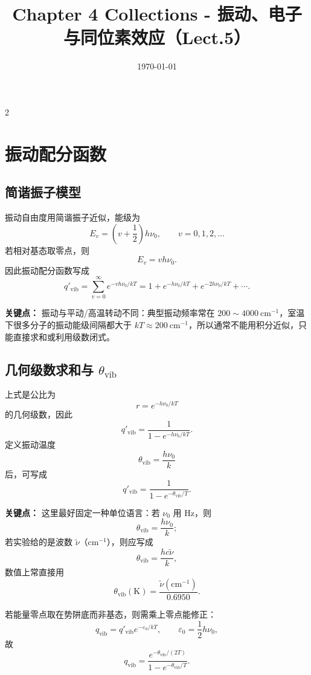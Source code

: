 \documentclass[a4paper,9pt]{article}
\title{\vspace{-2em}\Large\bfseries\color{sectioncolor} Chapter 4 Collections - 振动、电子与同位素效应（Lect.5）\vspace{-1em}}
\author{}
\date{\today}
\newenvironment{keypoint}
{\par\vspace{0.3em}\noindent\begin{tcolorbox}[colback=keybg,colframe=keycolor,boxrule=0.5pt,arc=2pt,left=2pt,right=2pt,top=2pt,bottom=2pt,boxsep=0pt]\noindent\textcolor{keycolor}{\textbf{关键点：}}}
{\end{tcolorbox}\par\vspace{0.3em}}
\begin{document}
\maketitle
\thispagestyle{fancy}
\begin{multicols}{2}
	\scriptsize{\tableofcontents}

	\section{振动配分函数}

	\subsection{简谐振子模型}
	振动自由度用简谐振子近似，能级为
	\[
		E_v=\left(v+\frac12\right)h\nu_0,
		\qquad v=0,1,2,\dots
	\]
	若相对基态取零点，则
	\[
		E_v=vh\nu_0.
	\]
	因此振动配分函数写成
	\[
		q'_{\mathrm{vib}}=\sum_{v=0}^{\infty} e^{-vh\nu_0/kT}
		=1+e^{-h\nu_0/kT}+e^{-2h\nu_0/kT}+\cdots.
	\]

	\begin{keypoint}
		振动与平动/高温转动不同：典型振动频率常在 $200\sim 4000\ \mathrm{cm^{-1}}$，室温下很多分子的振动能级间隔都大于 $kT\approx 200\ \mathrm{cm^{-1}}$，所以通常不能用积分近似，只能直接求和或利用级数闭式。
	\end{keypoint}

	\subsection{几何级数求和与 $\theta_{\mathrm{vib}}$}
	上式是公比为
	\[
		r=e^{-h\nu_0/kT}
	\]
	的几何级数，因此
	\[
		q'_{\mathrm{vib}}=\frac{1}{1-e^{-h\nu_0/kT}}.
	\]
	定义振动温度
	\[
		\theta_{\mathrm{vib}}=\frac{h\nu_0}{k}
	\]
	后，可写成
	\[
		q'_{\mathrm{vib}}=\frac{1}{1-e^{-\theta_{\mathrm{vib}}/T}}.
	\]

	\begin{keypoint}
		这里最好固定一种单位语言：若 $\nu_0$ 用 Hz，则
		\[
			\theta_{\mathrm{vib}}=\frac{h\nu_0}{k};
		\]
		若实验给的是波数 $\tilde\nu$（$\mathrm{cm^{-1}}$），则应写成
		\[
			\theta_{\mathrm{vib}}=\frac{hc\tilde\nu}{k},
		\]
		数值上常直接用
		\[
			\theta_{\mathrm{vib}}(\mathrm K)=\frac{\tilde\nu(\mathrm{cm^{-1}})}{0.6950}.
		\]
	\end{keypoint}

	若能量零点取在势阱底而非基态，则需乘上零点能修正：
	\[
		q_{\mathrm{vib}}=q'_{\mathrm{vib}}e^{-\varepsilon_0/kT},
		\qquad \varepsilon_0=\frac12 h\nu_0,
	\]
	故
	\[
		q_{\mathrm{vib}}=\frac{e^{-\theta_{\mathrm{vib}}/(2T)}}{1-e^{-\theta_{\mathrm{vib}}/T}}.
	\]


\end{multicols}
\end{document}
